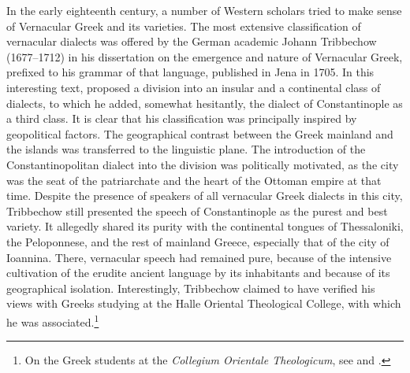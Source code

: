 In the early eighteenth century, a number of Western scholars tried to make sense of Vernacular Greek and its varieties. The most extensive classification of vernacular dialects was offered by the German academic Johann Tribbechow (1677–1712) in his dissertation on the emergence and nature of Vernacular Greek, prefixed to his grammar of that language, published in Jena in 1705. In this interesting text, \citet[a.4\textsc{\textsuperscript{r}}\textsc{–}a.4\textsc{\textsuperscript{v}}]{Tribbechow1705} proposed a division into an insular and a continental class of dialects, to which he added, somewhat hesitantly, the dialect of Constantinople as a third class. It is clear that his classification was principally inspired by geopolitical factors. The geographical contrast between the Greek mainland and the islands was transferred to the linguistic plane. The introduction of the Constantinopolitan dialect into the division was politically motivated, as the city was the seat of the patriarchate and the heart of the Ottoman empire at that time. Despite the presence of speakers of all vernacular Greek dialects in this city, Tribbechow still presented the speech of Constantinople as the purest and best variety. It allegedly shared its purity with the continental tongues of Thessaloniki, the Peloponnese, and the rest of mainland Greece, especially that of the city of Ioannina. There, vernacular speech had remained pure, because of the intensive cultivation of the erudite ancient language by its inhabitants and because of its geographical isolation. Interestingly, Tribbechow claimed to have verified his views with Greeks studying at the Halle Oriental Theological College, with which he was associated.\footnote{On the Greek students at the \textit{Collegium Orientale Theologicum}, see \citet{Moennig1998} and \citet[283]{Makrides2006}.}

